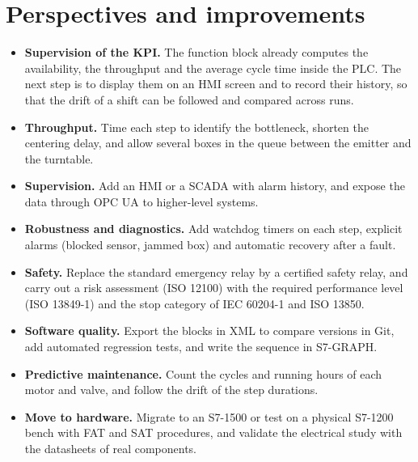 \documentclass[11pt,a4paper]{report}
\newcommand{\tg}[1]{\texttt{\detokenize{#1}}}
\begin{document}
\section*{Perspectives and improvements}
\begin{itemize}
  \item \textbf{Supervision of the KPI.} The function block \tg{FB_Kpi} already computes the availability, the throughput and the average cycle time inside the PLC. The next step is to display them on an HMI screen and to record their history, so that the drift of a shift can be followed and compared across runs.
  \item \textbf{Throughput.} Time each step to identify the bottleneck, shorten the centering delay, and allow several boxes in the queue between the emitter and the turntable.
  \item \textbf{Supervision.} Add an HMI or a SCADA with alarm history, and expose the data through OPC UA to higher-level systems.
  \item \textbf{Robustness and diagnostics.} Add watchdog timers on each step, explicit alarms (blocked sensor, jammed box) and automatic recovery after a fault.
  \item \textbf{Safety.} Replace the standard emergency relay by a certified safety relay, and carry out a risk assessment (ISO 12100) with the required performance level (ISO 13849-1) and the stop category of IEC 60204-1 and ISO 13850.
  \item \textbf{Software quality.} Export the blocks in XML to compare versions in Git, add automated regression tests, and write the sequence in S7-GRAPH.
  \item \textbf{Predictive maintenance.} Count the cycles and running hours of each motor and valve, and follow the drift of the step durations.
  \item \textbf{Move to hardware.} Migrate to an S7-1500 or test on a physical S7-1200 bench with FAT and SAT procedures, and validate the electrical study with the datasheets of real components.
\end{itemize}
\end{document}
